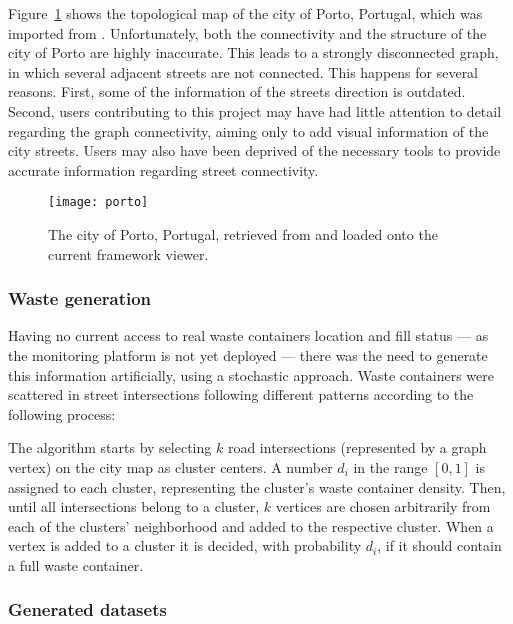 Figure~\ref{fig:porto} shows the topological map of the city of Porto,
Portugal, which was imported from \textit{\osm}. Unfortunately, both the
connectivity and the structure of the city of Porto are highly inaccurate. This
leads to a strongly disconnected graph, in which several adjacent streets are
not connected. This happens for several reasons. First, some of the information
of the streets direction is outdated. Second, users contributing to this
project may have had little attention to detail regarding the graph
connectivity, aiming only to add visual information of the city streets. Users
may also have been deprived of the necessary tools to provide accurate
information regarding street connectivity.

\begin{figure}[th]
  \begin{center}
    \leavevmode
    \texttt{[image: porto]}
    \caption{The city of Porto, Portugal, retrieved from \osm{} and loaded onto the current framework viewer.}
    \label{fig:porto}
  \end{center}
\end{figure}

\subsubsection{Waste generation}
\label{section:waste-generation}

Having no current access to real waste containers location and fill status ---
as the monitoring platform is not yet deployed --- there was the need to
generate this information artificially, using a stochastic approach. Waste
containers were scattered in street intersections following different patterns
according to the following process:

The algorithm starts by selecting $k$ road intersections (represented by a
graph vertex) on the city map as cluster centers. A number $d_i$ in the range
$[0, 1]$ is assigned to each cluster, representing the cluster's waste
container density. Then, until all intersections belong to a cluster, $k$
vertices are chosen arbitrarily from each of the clusters' neighborhood and
added to the respective cluster. When a vertex is added to a cluster it is
decided, with probability $d_i$, if it should contain a full waste container.

\subsubsection{Generated datasets}
\label{section:large-datasets}

